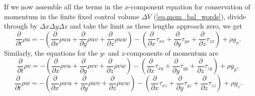 \documentclass[twoside,11pt]		{report}
\begin{document}
If we now assemble all the terms in the $x$-component equation for
conservation of momentum in the finite fixed control volume $\Delta V$
(\ref{eq.mom_bal_words}), divide through by $\Delta x\Delta y\Delta z$
and take the limit as these lengths approach zero, we get
\begin{equation}
\frac{\partial}{\partial t}\rho u=
-\left(
\frac{\partial}{\partial x}\rho uu+
\frac{\partial}{\partial y}\rho uv+
\frac{\partial}{\partial z}\rho uw
\right)
-\left(
\frac{\partial}{\partial x}\tau_{xx}+
\frac{\partial}{\partial y}\tau_{yx}+
\frac{\partial}{\partial z}\tau_{zx}
\right)
+\rho g_x.
\end{equation}
Similarly, the equations for the $y$- and $z$-components of momentum are
\begin{equation}
\frac{\partial}{\partial t}\rho v=
-\left(
\frac{\partial}{\partial x}\rho vu+
\frac{\partial}{\partial y}\rho vv+
\frac{\partial}{\partial z}\rho vw
\right)
-\left(
\frac{\partial}{\partial x}\tau_{xy}+
\frac{\partial}{\partial y}\tau_{yy}+
\frac{\partial}{\partial z}\tau_{zy}
\right)
+\rho g_y,
\end{equation}
\begin{equation}
\frac{\partial}{\partial t}\rho w=
-\left(
\frac{\partial}{\partial x}\rho wu+
\frac{\partial}{\partial y}\rho wv+
\frac{\partial}{\partial z}\rho ww
\right)
-\left(
\frac{\partial}{\partial x}\tau_{xz}+
\frac{\partial}{\partial y}\tau_{yz}+
\frac{\partial}{\partial z}\tau_{zz}
\right)
+\rho g_z.
\end{equation}
\end{document}
